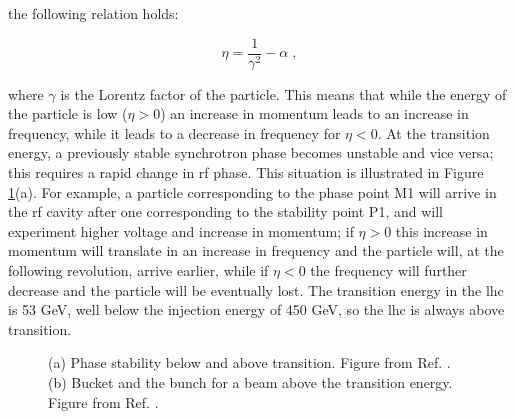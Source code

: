 \noindent the following relation holds:

\begin{equation}
\eta = \frac{1}{\gamma^2} - \alpha \; ,
\end{equation}

where $\gamma$ is the Lorentz factor of the particle. This means that while the energy of the particle is low ($\eta>0$) an increase in momentum leads to an increase in frequency, while it leads to a decrease in frequency for $\eta<0$. At the transition energy, a previously stable synchrotron phase becomes unstable and vice versa; this requires a rapid change in \gls{rf} phase. This situation is illustrated in Figure \ref{fig:lhc:phase}(a). For example, a particle corresponding to the phase point M1 will arrive in the \gls{rf} cavity after one corresponding to the stability point P1, and will experiment higher voltage and increase in momentum; if $\eta>0$ this increase in momentum will translate in an increase in frequency and the particle will, at the following revolution, arrive earlier, while if $\eta<0$ the frequency will further decrease and the particle will be eventually lost.  The transition energy in the \gls{lhc} is 53 GeV, well below the injection energy of 450 GeV, so the \gls{lhc} is always above transition. 

\begin{figure}[ht]
\centering
{}
\caption{(a) Phase stability below and above transition. Figure from Ref. \cite{Tecker:2016mlq}. (b) Bucket and the bunch for a beam above the transition energy. Figure from Ref. \cite{Baird:1017689}.}
\label{fig:lhc:phase}
\end{figure}


